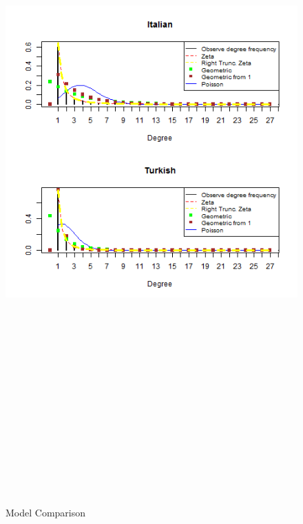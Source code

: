\documentclass[paper=a4, fontsize=11pt]{scrartcl} %
\theoremstyle{plain}
\begin{document}
\begin{figure}[htbp] %
   \centering
   \includegraphics[width=15cm,height=27cm]{General_5} %
   \caption{Model Comparison}
   \label{fig:example}

\end{figure}
\end{document}
